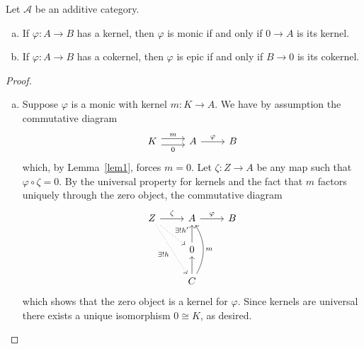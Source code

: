 \documentclass[10pt]{amsart}
\begin{document}
\begin{lem}\label{lem3}
  Let $\mathcal{A}$ be an additive category.
  \begin{enumerate}[(a)]
  \item
    If $\varphi : A \rightarrow B$ has a kernel, then $\varphi$ is monic if and only if $0 \rightarrow A$ is its kernel.
  \item
    If $\varphi : A \rightarrow B$ has a cokernel, then $\varphi$ is epic if and only if $B \rightarrow 0$ is its cokernel.
  \end{enumerate}

  \begin{proof}
    \begin{enumerate}[(a)]
    \item
      Suppose $\varphi$ is a monic with kernel $m : K \rightarrow A$.
      We have by assumption the commutative diagram
      $$\begin{tikzcd}
	K \arrow[shift left = 0.75ex]{r}{m} \arrow[shift right=0.75ex, swap]{r}{0}& A\arrow{r}{\varphi} & B
      \end{tikzcd}$$
      which, by Lemma~\ref{lem1}, forces $m = 0$.
      Let $\zeta : Z \rightarrow A$ be any map such that $\varphi \circ \zeta = 0$.
      By the universal property for kernels and the fact that $m$ factors uniquely through the zero object, the commutative diagram
      $$\begin{tikzcd}
	Z \arrow[dotted]{rd}{\exists ! h^\prime}\arrow[dotted,swap]{rdd}{\exists ! h} \arrow{r}{\zeta} & A \arrow{r}{\varphi} & B\\
	& 0 \arrow{u}\\
	& C \arrow{u} \arrow[bend right,swap]{uu}{m}
      \end{tikzcd}$$
      which shows that the zero object is a kernel for $\varphi$.
      Since kernels are universal there exists a unique isomorphism $0 \cong K$, as desired.
      

\end{enumerate}
\end{proof}
\end{lem}
\end{document}
